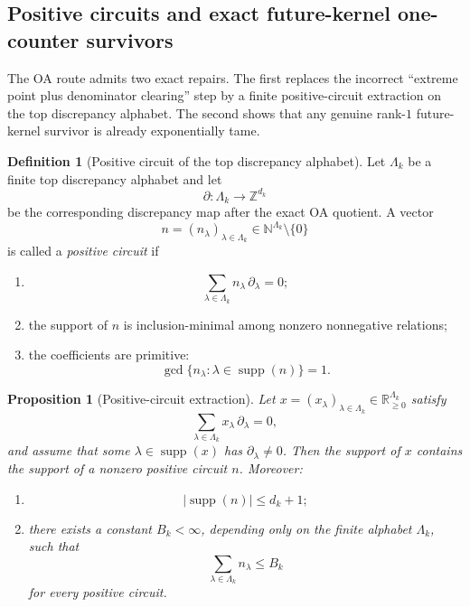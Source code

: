 \documentclass[11pt]{article}
\newtheorem{proposition}[theorem]{Proposition}
\theoremstyle{definition}
\newtheorem{definition}[theorem]{Definition}
\newcommand{\supp}{\operatorname{supp}}
\newcommand{\N}{\mathbb{N}}
\newcommand{\Z}{\mathbb{Z}}
\newcommand{\R}{\mathbb{R}}
\newcommand{\1}{\mathbf{1}}
\begin{document}
\subsection*{Positive circuits and exact future-kernel one-counter survivors}
The OA route admits two exact repairs.
The first replaces the incorrect ``extreme point plus denominator clearing'' step by a finite positive-circuit extraction on the top discrepancy alphabet.
The second shows that any genuine rank-$1$ future-kernel survivor is already exponentially tame.

\begin{definition}[Positive circuit of the top discrepancy alphabet]\label{def:top-positive-circuit}
Let $\Lambda_k$ be a finite top discrepancy alphabet and let
\[
\partial:\Lambda_k\to \Z^{d_k}
\]
be the corresponding discrepancy map after the exact OA quotient.
A vector
\[
n=(n_\lambda)_{\lambda\in \Lambda_k}\in \N^{\Lambda_k}\setminus\{0\}
\]
is called a \emph{positive circuit} if
\begin{enumerate}[label=(\roman*),leftmargin=2.2em]
\item
\[
\sum_{\lambda\in \Lambda_k} n_\lambda\,\partial_\lambda=0;
\]
\item the support of $n$ is inclusion-minimal among nonzero nonnegative relations;
\item the coefficients are primitive:
\[
\gcd\{n_\lambda:\lambda\in \supp(n)\}=1.
\]
\end{enumerate}
\end{definition}

\begin{proposition}[Positive-circuit extraction]\label{prop:top-positive-circuit}
Let $x=(x_\lambda)_{\lambda\in \Lambda_k}\in \R_{\ge 0}^{\Lambda_k}$ satisfy
\[
\sum_{\lambda\in \Lambda_k} x_\lambda\,\partial_\lambda=0,
\]
and assume that some $\lambda\in \supp(x)$ has $\partial_\lambda\neq 0$.
Then the support of $x$ contains the support of a nonzero positive circuit $n$.
Moreover:
\begin{enumerate}[label=(\roman*),leftmargin=2.2em]
\item
\[
|\supp(n)|\le d_k+1;
\]
\item there exists a constant $B_k<\infty$, depending only on the finite alphabet $\Lambda_k$, such that
\[
\sum_{\lambda\in \Lambda_k} n_\lambda\le B_k
\]
for every positive circuit.
\end{enumerate}
\end{proposition}
\end{document}

